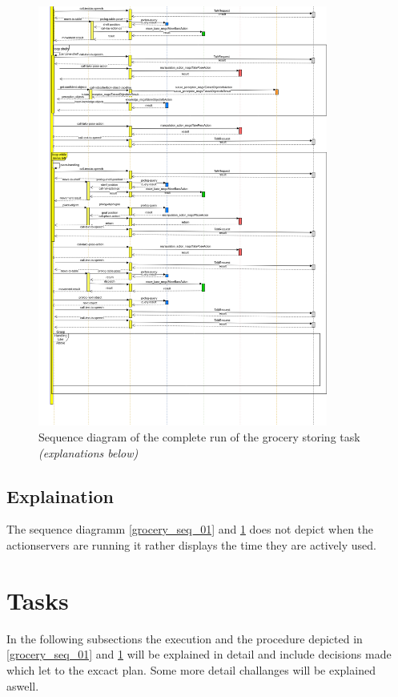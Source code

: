 \documentclass[main.tex]{subfiles}
\begin{document}
		\begin{figure}	
			\centering
			\includegraphics[width=0.85\textwidth]{pictures/diagramms/second-part-grocery-sequence.png}
			\caption{Sequence diagram of the complete run of the grocery storing task \textit{(explanations below)}}
			\label{grocery_seq_02}
		\end{figure}
	
	\subsection{Explaination}
	
		The sequence diagramm \ref{grocery_seq_01} and \ref{grocery_seq_02} does not depict when the actionservers are running it rather displays the time they are actively used.

	\section{Tasks}
	In the following subsections the execution and the procedure depicted in \ref{grocery_seq_01} and \ref{grocery_seq_02} will be explained in detail and include decisions made which let to the excact plan. Some more detail challanges will be explained aswell.
\end{document}
